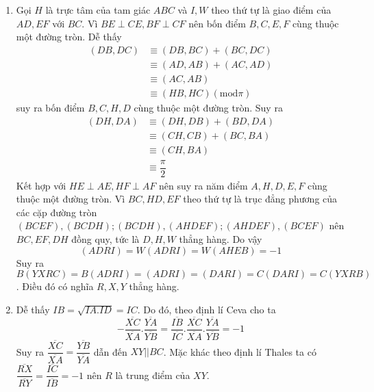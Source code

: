 \begin{bt}
{\begin{bode}
\begin{cm}
\begin{center}
			\end{center}
				\begin{enumerate}
					\item Gọi $H$ là trực tâm của tam giác $ABC$ và $I, W$ theo thứ tự là giao điểm của $AD, EF$ với $BC$.
					Vì $BE \perp CE, BF \perp CF$ nên bốn điểm $B, C, E, F$ cùng thuộc một đường tròn. Dễ thấy 
					\begin{align*}
						(DB,DC)&\equiv (DB,BC)+(BC,DC) \\ &\equiv (AD,AB)+(AC,AD)\\ &\equiv (AC,AB) \\ &\equiv (HB,HC) (\text{mod} \pi)
					\end{align*}
					suy ra bốn điểm $B, C, H, D$ cùng thuộc một đường tròn. Suy ra
					\begin{align*}
						(DH,DA)&\equiv (DH,DB)+(BD,DA) \\ &\equiv (CH,CB)+(BC,BA)\\ &\equiv (CH,BA) \\ &\equiv \dfrac{\pi}{2}
					\end{align*}
					Kết hợp với $HE\perp AE, HF\perp AF$ nên suy ra năm điểm $A, H, D, E, F$ cùng thuộc một đường tròn. Vì $BC, HD, EF$ theo thứ tự là trục đẳng phương của các cặp đường tròn $(BCEF), (BCDH); (BCDH), (AHDEF); (AHDEF), (BCEF)$ nên $BC, EF, DH$ đồng quy, tức là $D, H, W$ thẳng hàng. Do vậy $$(ADRI)=W(ADRI)=W(AHEB)=-1$$
					Suy ra $B(YXRC)=B(ADRI)=(ADRI)=(DARI)=C(DARI)=
					C(YXRB)$. Điều đó có nghĩa $R, X, Y$ thẳng hàng.
					\item Dễ thấy $IB=\sqrt{IA.ID}=IC$. Do đó, theo định lí Ceva cho ta $$-\dfrac{\overline{XC}}{\overline{XA}}.\dfrac{\overline{YA}}{\overline{YB}}=\dfrac{\overline{IB}}{\overline{IC}}.\dfrac{\overline{XC}}{\overline{XA}}.\dfrac{\overline{YA}}{\overline{YB}}=-1$$
					Suy ra $\dfrac{\overline{XC}}{\overline{XA}}=\dfrac{\overline{YB}}{\overline{YA}}$ dẫn đến $XY||BC$.
					Mặc khác theo định lí Thales ta có $\dfrac{\overline{RX}}{\overline{RY}}=\dfrac{\overline{IC}}{\overline{IB}}=-1$ nên $R$ là trung điểm của $XY$.

\end{enumerate}
\end{cm}
\end{bode}}
\end{bt}
